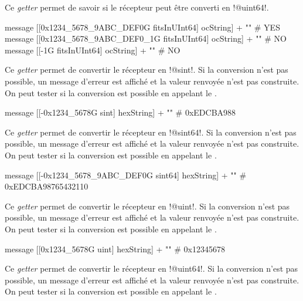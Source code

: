 
Ce \emph{getter} permet de savoir si le récepteur peut être converti en \ggs!@uint64!.

\begin{galgas}
message [[0x1234_5678_9ABC_DEF0G fitsInUInt64] ocString] + "\n" # YES
message [[0x1234_5678_9ABC_DEF0_1G fitsInUInt64] ocString] + "\n" # NO
message [[-1G fitsInUInt64] ocString] + "\n" # NO
\end{galgas}



Ce \emph{getter} permet de convertir le récepteur en \ggs!@sint!. Si la conversion n'est pas possible, un message d'erreur est affiché et la valeur renvoyée n'est pas construite. On peut tester si la conversion est possible en appelant le .

\begin{galgas}
message [[-0x1234_5678G sint] hexString] + "\n" # 0xEDCBA988
\end{galgas}





Ce \emph{getter} permet de convertir le récepteur en \ggs!@sint64!. Si la conversion n'est pas possible, un message d'erreur est affiché et la valeur renvoyée n'est pas construite. On peut tester si la conversion est possible en appelant le .

\begin{galgas}
message [[-0x1234_5678_9ABC_DEF0G sint64] hexString] + "\n" # 0xEDCBA98765432110
\end{galgas}



Ce \emph{getter} permet de convertir le récepteur en \ggs!@uint!. Si la conversion n'est pas possible, un message d'erreur est affiché et la valeur renvoyée n'est pas construite. On peut tester si la conversion est possible en appelant le .

\begin{galgas}
message [[0x1234_5678G uint] hexString] + "\n" # 0x12345678
\end{galgas}



Ce \emph{getter} permet de convertir le récepteur en \ggs!@uint64!. Si la conversion n'est pas possible, un message d'erreur est affiché et la valeur renvoyée n'est pas construite. On peut tester si la conversion est possible en appelant le .

